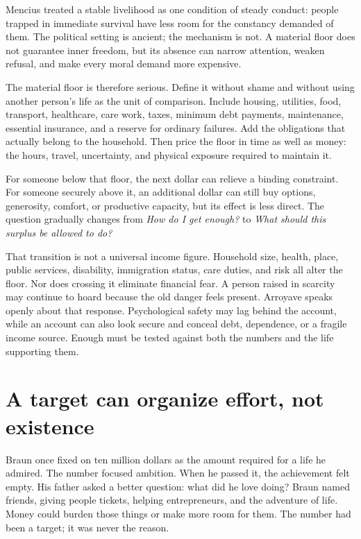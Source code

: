 Mencius treated a stable livelihood as one condition of steady conduct: people
trapped in immediate survival have less room for the constancy demanded of
them. The political setting is ancient; the mechanism is not. A material floor
does not guarantee inner freedom, but its absence can narrow attention, weaken
refusal, and make every moral demand more expensive.

The material floor is therefore serious. Define it without shame and without
using another person's life as the unit of comparison. Include housing,
utilities, food, transport, healthcare, care work, taxes, minimum debt
payments, maintenance, essential insurance, and a reserve for ordinary
failures. Add the obligations that actually belong to the household. Then
price the floor in time as well as money: the hours, travel, uncertainty, and
physical exposure required to maintain it.

For someone below that floor, the next dollar can relieve a binding
constraint. For someone securely above it, an additional dollar can still buy
options, generosity, comfort, or productive capacity, but its effect is less
direct. The question gradually changes from \emph{How do I get enough?} to
\emph{What should this surplus be allowed to do?}

That transition is not a universal income figure. Household size, health,
place, public services, disability, immigration status, care duties, and risk
all alter the floor. Nor does crossing it eliminate financial fear. A person
raised in scarcity may continue to hoard because the old danger feels present.
Arroyave speaks openly about that response. Psychological safety may lag
behind the account, while an account can also look secure and conceal debt,
dependence, or a fragile income source. Enough must be tested against both the
numbers and the life supporting them.

\section{A target can organize effort, not existence}

Braun once fixed on ten million dollars as the amount required for a life he
admired. The number focused ambition. When he passed it, the achievement felt
empty. His father asked a better question: what did he love doing? Braun named
friends, giving people tickets, helping entrepreneurs, and the adventure of
life. Money could burden those things or make more room for them. The number
had been a target; it was never the reason.

